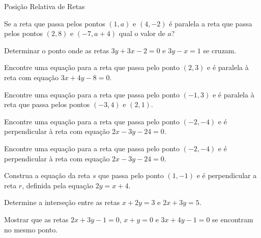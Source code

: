 
\begin{exercicios}{Posição Relativa de Retas}
    
    \begin{exercicio}
        Se a reta que passa pelos pontos $(1,a)$ e $(4,-2)$ é paralela a
        reta que passa pelos pontos $(2,8)$ e $(-7,a+4)$ qual o valor de $a$?
    \end{exercicio}
    
    \begin{exercicio}
        Determinar o ponto onde as retas $3y+3x-2=0$ e $3y-x=1$ se cruzam.
    \end{exercicio}
    
    \begin{exercicio}
        Encontre uma equação para a reta que passa pelo ponto $(2, 3)$ e é  paralela à reta com equação $3x + 4y - 8 = 0$. 		
    \end{exercicio}
    
    \begin{exercicio}
        Encontre uma equação para a reta que passa pelo ponto $(-1, 3)$ e é paralela à reta que passa pelos pontos $(-3, 4)$ e $(2, 1)$.	
    \end{exercicio}

    \begin{exercicio}
        Encontre uma equação para a reta que passa pelo ponto $(-2,-4)$ e é perpendicular à reta com equação $2x-3y-24=0$. 
    \end{exercicio}

    \begin{exercicio}
        Encontre uma equação para a reta que passa pelo ponto $(-2,-4)$ e é perpendicular à reta com equação $2x-3y-24=0$.
    \end{exercicio}
    
    \begin{exercicio}
        Construa a equação da reta $s$ que passa pelo ponto $(1,-1)$ e é perpendicular a reta $r$, definida pela equação $2y=x+4$.
    \end{exercicio}

    \begin{exercicio}
        Determine a interseção entre as retas $x+2y=3$ e $2x+3y=5$.
    \end{exercicio}
    
    \begin{exercicio}
        Mostrar que as retas $2x+3y-1=0$, $x+y=0$ e $3x+4y-1=0$ se encontram no mesmo ponto.
    \end{exercicio}
    
\end{exercicios}

